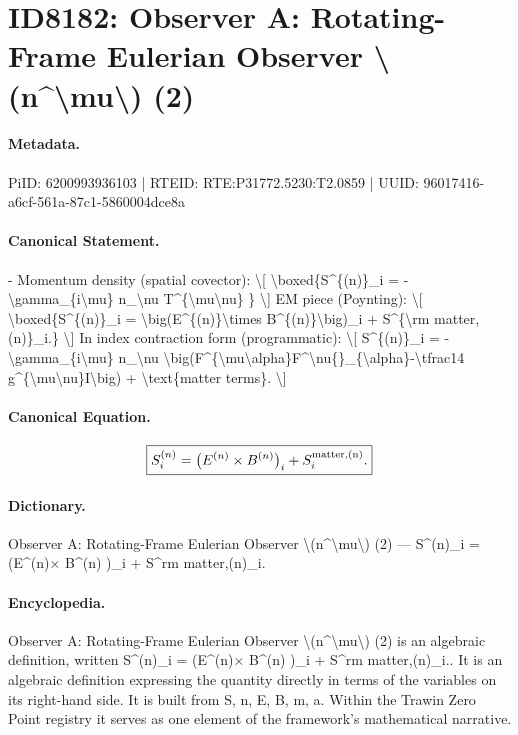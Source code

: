 \section*{ID8182: Observer A: Rotating-Frame Eulerian Observer \textbackslash{}(n\textasciicircum{}\textbackslash{}mu\textbackslash{}) (2)}
\paragraph{Metadata.}
PiID: 6200993936103 | RTEID: RTE:P31772.5230:T2.0859 | UUID: 96017416-a6cf-561a-87c1-5860004dce8a

\paragraph{Canonical Statement.}
- Momentum density (spatial covector): \textbackslash{}[ \textbackslash{}boxed\{S\textasciicircum{}\{(n)\}\_i = -\textbackslash{}gamma\_\{i\textbackslash{}mu\} n\_\textbackslash{}nu T\textasciicircum{}\{\textbackslash{}mu\textbackslash{}nu\} \} \textbackslash{}] EM piece (Poynting): \textbackslash{}[ \textbackslash{}boxed\{S\textasciicircum{}\{(n)\}\_i = \textbackslash{}big(E\textasciicircum{}\{(n)\}\textbackslash{}times B\textasciicircum{}\{(n)\}\textbackslash{}big)\_i + S\textasciicircum{}\{\textbackslash{}rm matter,(n)\}\_i.\} \textbackslash{}] In index contraction form (programmatic): \textbackslash{}[ S\textasciicircum{}\{(n)\}\_i = -\textbackslash{}gamma\_\{i\textbackslash{}mu\} n\_\textbackslash{}nu \textbackslash{}big(F\textasciicircum{}\{\textbackslash{}mu\textbackslash{}alpha\}F\textasciicircum{}\textbackslash{}nu\{\}\_\{\textbackslash{}alpha\}-\textbackslash{}tfrac14 g\textasciicircum{}\{\textbackslash{}mu\textbackslash{}nu\}I\textbackslash{}big) + \textbackslash{}text\{matter terms\}. \textbackslash{}]

\paragraph{Canonical Equation.}
\[
\boxed{S^{(n)}_i = \big(E^{(n)}\times B^{(n)}\big)_i + S^{\rm matter,(n)}_i.}
\]

\paragraph{Dictionary.}
Observer A: Rotating-Frame Eulerian Observer \textbackslash{}(n\textasciicircum{}\textbackslash{}mu\textbackslash{}) (2) — S\textasciicircum{}(n)\_i = (E\textasciicircum{}(n)× B\textasciicircum{}(n) )\_i + S\textasciicircum{}rm matter,(n)\_i.

\paragraph{Encyclopedia.}
Observer A: Rotating-Frame Eulerian Observer \textbackslash{}(n\textasciicircum{}\textbackslash{}mu\textbackslash{}) (2) is an algebraic definition, written S\textasciicircum{}(n)\_i = (E\textasciicircum{}(n)× B\textasciicircum{}(n) )\_i + S\textasciicircum{}rm matter,(n)\_i.. It is an algebraic definition expressing the quantity directly in terms of the variables on its right-hand side. It is built from S, n, E, B, m, a. Within the Trawin Zero Point registry it serves as one element of the framework's mathematical narrative.
